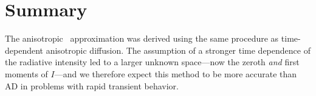 \section{Summary}
The anisotropic \Pone\ approximation was derived using the same procedure as 
time-dependent anisotropic diffusion. The assumption of a stronger time
dependence of the radiative intensity led to a larger unknown space---now the
zeroth \emph{and} first moments of $I$---and we therefore expect this method to
be more accurate than AD in problems with rapid transient behavior.


